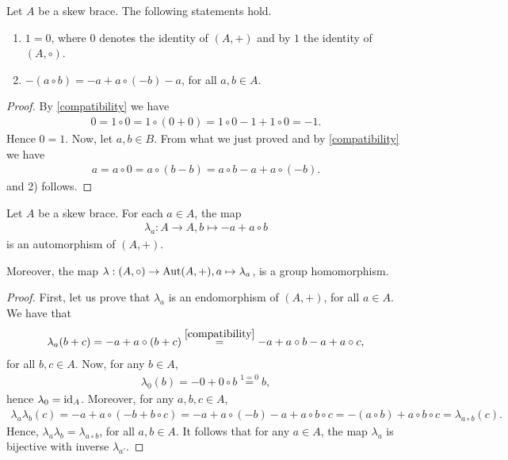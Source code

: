    \begin{lemma}\label{lem:propskew}
        Let $A$ be a skew brace. The following statements hold.
        \begin{enumerate}
            \item $1=0$, where $0$ denotes the identity of $(A,+)$ and by $1$ the identity of $(A,\circ)$.
            \item $-(a\circ b) = - a + a\circ(- b) - a$, for all $a,b \in A$.
        \end{enumerate}
    \end{lemma}
    \begin{proof}
        By \eqref{compatibility} we have
        \begin{align*}
            0= 1\circ 0 = 1 \circ (0+0) = 1\circ 0 -1 + 1 \circ 0 = -1.
        \end{align*}
        Hence $0=1$. 
        Now, let $a,b\in B$. From what we just proved and by \eqref{compatibility}
        we have 
        \begin{align*}
            a = a \circ 0 = a\circ (b-b) = a\circ b - a + a\circ (-b).
        \end{align*}
        and 2) follows. 
    \end{proof}
    
    \begin{proposition}\label{prop:lambda}
        Let $A$ be a skew brace. For each $a\in A$, the map 
        \begin{align*}
            \lambda_a:A\to A, b\mapsto -a + a \circ b
        \end{align*}
    is an automorphism of $(A,+)$. 
    
    Moreover, the map $\lambda: (A,\circ) \to \operatorname{Aut}(A,+), a \mapsto \lambda_a$, is a group homomorphism.
    \end{proposition}

    \begin{proof}
        First, let us prove that $\lambda_a$ is an endomorphism of $(A,+)$, for all $a\in A$.
        We have that
        \begin{align*}
            \lambda_a(b+c) = -a+a\circ (b+c) \overset{\eqref{compatibility}}{=} -a +a\circ b -a +a\circ c,
        \end{align*}
        for all $b,c\in A$. Now, for any $b\in A$,
        \begin{align*}
            \lambda_0(b) = - 0 + 0 \circ b \overset{1=0}{=} b,
        \end{align*}
        hence $\lambda_0=\operatorname{id}_A$. Moreover, for any $a,b,c\in A$, 
        \begin{align*}
            \lambda_a\lambda_b(c) = -a +a\circ(-b+b\circ c) = -a + a\circ(-b) - a + a\circ b \circ c=-(a\circ b) + a\circ b \circ c = \lambda_{a\circ b}(c).
        \end{align*}
        Hence, $\lambda_a\lambda_b=\lambda_{a\circ b}$, for all $a,b\in A$. It follows that for any $a\in A$, the map $\lambda_a$ is bijective with inverse $\lambda_{a'}$. 
    \end{proof}

